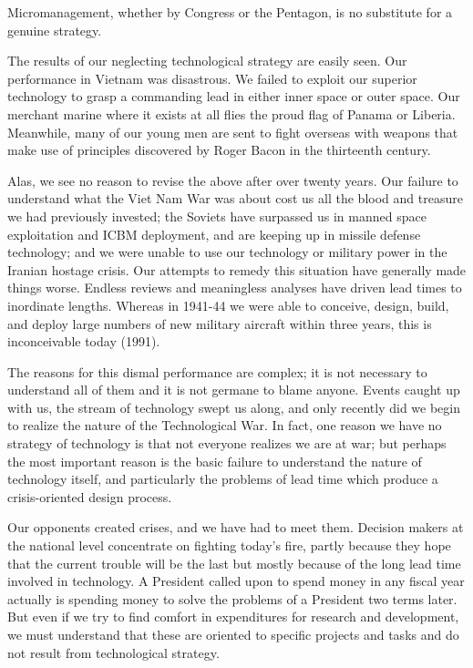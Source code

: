 Micromanagement, whether by Congress or the Pentagon, is no substitute for a genuine strategy.

The results of our neglecting technological strategy are easily seen. Our performance in Vietnam was disastrous. We failed to exploit our superior technology to grasp a commanding lead in either inner space or outer space. Our merchant marine where it exists at all flies the proud flag of Panama or Liberia. Meanwhile, many of our young men are sent to fight overseas with weapons that make use of principles discovered by Roger Bacon in the thirteenth century.

\begin{mdframed}[backgroundcolor=black!10]
Alas, we see no reason to revise the above after over twenty years. Our failure to understand what the Viet Nam War was about cost us all the blood and treasure we had previously invested; the Soviets have surpassed us in manned space exploitation and ICBM deployment, and are keeping up in missile defense technology; and we were unable to use our technology or military power in the Iranian hostage crisis.
Our attempts to remedy this situation have generally made things worse. Endless reviews and meaningless analyses have driven lead times to inordinate lengths. Whereas in 1941-44 we were able to conceive, design, build, and deploy large numbers of new military aircraft within three years, this is inconceivable today (1991).
\end{mdframed}

The reasons for this dismal performance are complex; it is not necessary to understand all of them and it is not germane to blame anyone. Events caught up with us, the stream of technology swept us along, and only recently did we begin to realize the nature of the Technological War. In fact, one reason we have no strategy of technology is that not everyone realizes we are at war; but perhaps the most important reason is the basic failure to understand the nature of technology itself, and particularly the problems of lead time which produce a crisis-oriented design process.

Our opponents created crises, and we have had to meet them. Decision makers at the national level concentrate on fighting today's fire, partly because they hope that the current trouble will be the last but mostly because of the long lead time involved in technology. A President called upon to spend money in any fiscal year actually is spending money to solve the problems of a President two terms later. But even if we try to find comfort in expenditures for research and development, we must understand that these are oriented to specific projects and tasks and do not result from technological strategy.

